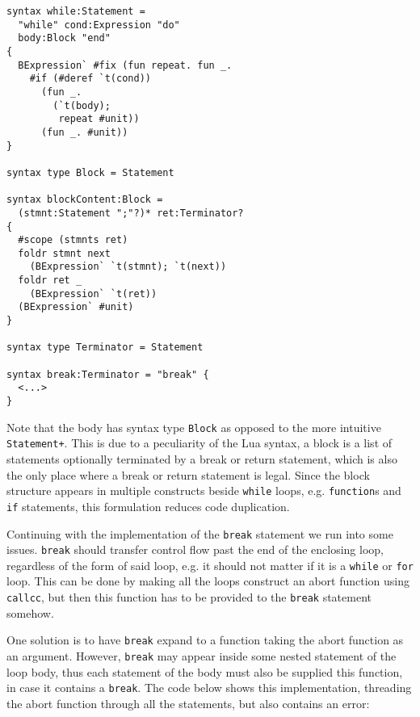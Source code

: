 \documentclass{kththesis}
\begin{document}
\begin{verbatim}
syntax while:Statement =
  "while" cond:Expression "do"
  body:Block "end"
{
  BExpression` #fix (fun repeat. fun _.
    #if (#deref `t(cond))
      (fun _.
        (`t(body);
         repeat #unit))
      (fun _. #unit))
}

syntax type Block = Statement

syntax blockContent:Block =
  (stmnt:Statement ";"?)* ret:Terminator?
{
  #scope (stmnts ret)
  foldr stmnt next
    (BExpression` `t(stmnt); `t(next))
  foldr ret _
    (BExpression` `t(ret))
  (BExpression` #unit)
}

syntax type Terminator = Statement

syntax break:Terminator = "break" {
  <...>
}
\end{verbatim}

Note that the body has syntax type \texttt{Block} as opposed to the more intuitive \texttt{Statement+}. This is due to a peculiarity of the Lua syntax, a block is a list of statements optionally terminated by a break or return statement, which is also the only place where a break or return statement is legal. Since the block structure appears in multiple constructs beside \texttt{while} loops, e.g. \texttt{function}s and \texttt{if} statements, this formulation reduces code duplication.

Continuing with the implementation of the \texttt{break} statement we run into some issues. \texttt{break} should transfer control flow past the end of the enclosing loop, regardless of the form of said loop, e.g. it should not matter if it is a \texttt{while} or \texttt{for} loop. This can be done by making all the loops construct an abort function using \texttt{callcc}, but then this function has to be provided to the \texttt{break} statement somehow.

One solution is to have \texttt{break} expand to a function taking the abort function as an argument. However, \texttt{break} may appear inside some nested statement of the loop body, thus each statement of the body must also be supplied this function, in case it contains a \texttt{break}. The code below shows this implementation, threading the abort function through all the statements, but also contains an error:
\end{document}
